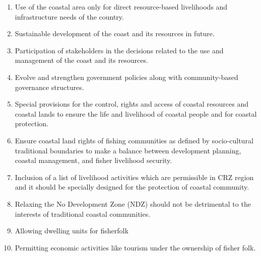 \begin{multicols}{2}
\vspace{-.4cm}

\begin{enumerate}
\itemsep=0pt
\item Use of the coastal area only for direct resource-based livelihoods and infrastructure
needs of the country.

\item Sustainable development of the coast and its resources in future.

\item Participation of stakeholders in the decisions related to the use and management of the
coast and its resources.

\item Evolve and strengthen government policies along with community-based governance
structures.

\item Special provisions for the control, rights and access of coastal resources and coastal
lands to ensure the life and livelihood of coastal people and for coastal protection.

\item Ensure coastal land rights of fishing communities as defined by socio-cultural
traditional boundaries to make a balance between development planning, coastal
management, and fisher livelihood security.

\item Inclusion of a list of livelihood activities which are permissible in CRZ region and it
should be specially designed for the protection of coastal community.

\item Relaxing the No Development Zone (NDZ) should not be detrimental to the interests
of traditional coastal communities.

\item Allowing dwelling units for fisherfolk

\item Permitting economic activities like tourism under the ownership of fisher folk.
\end{enumerate}

\vspace{-.2cm}


\end{multicols}
